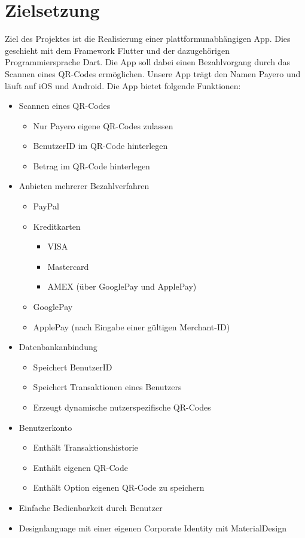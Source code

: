 
\chapter{Zielsetzung}

Ziel des Projektes ist die Realisierung einer plattformunabhängigen App.
Dies geschieht mit dem Framework Flutter und der dazugehörigen Programmiersprache Dart.
Die App soll dabei einen Bezahlvorgang durch das Scannen eines QR-Codes ermöglichen.
Unsere App trägt den Namen \glqq Payero\grqq{} und läuft auf iOS und Android.
Die App bietet folgende Funktionen:

\begin{itemize}
    \item Scannen eines QR-Codes
    \begin{itemize}
        \item Nur Payero eigene QR-Codes zulassen
        \item BenutzerID im QR-Code hinterlegen
        \item Betrag im QR-Code hinterlegen
    \end{itemize}
    \item Anbieten mehrerer Bezahlverfahren
    \begin{itemize}
        \item PayPal
        \item Kreditkarten
        \begin{itemize}
            \item VISA
            \item Mastercard
            \item AMEX (über GooglePay und ApplePay)
        \end{itemize}
        \item GooglePay
        \item ApplePay (nach Eingabe einer gültigen Merchant-ID)
    \end{itemize}
    \item Datenbankanbindung
    \begin{itemize}
        \item Speichert BenutzerID
        \item Speichert Transaktionen eines Benutzers
        \item Erzeugt dynamische nutzerspezifische QR-Codes
    \end{itemize}
    \item Benutzerkonto
    \begin{itemize}
        \item Enthält Transaktionshistorie
        \item Enthält eigenen QR-Code
        \item Enthält Option eigenen QR-Code zu speichern
    \end{itemize}
    \item Einfache Bedienbarkeit durch Benutzer
    \item Designlanguage mit einer eigenen Corporate Identity mit MaterialDesign
\end{itemize}